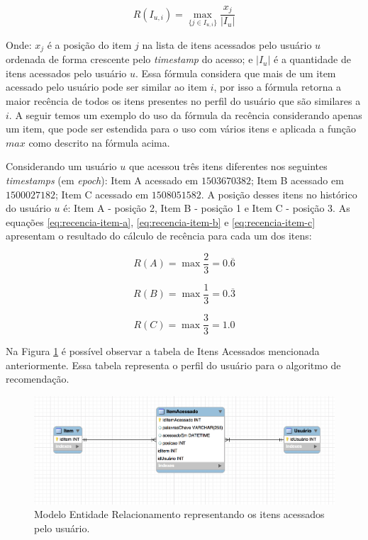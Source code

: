 \begin{equation}
  R(I_{u,i}) = \max_{\{j \in I_{u,i}\}}{\frac{x_j}{\left| I_u \right|}}
  \label{eq:recencia-proposta}
\end{equation}

Onde: $x_j$ é a posição do item $j$ na lista de itens acessados pelo usuário $u$ ordenada de forma crescente pelo
\textit{timestamp} do acesso; e $\left| I_u \right|$ é a quantidade de itens acessados pelo usuário $u$. Essa fórmula considera
que mais de um item acessado pelo usuário pode ser similar ao item $i$, por isso a fórmula retorna a maior recência de
todos os itens presentes no perfil do usuário que são similares a $i$. A seguir temos um exemplo do uso da fórmula da
recência considerando apenas um item, que pode ser estendida para o uso com vários itens e aplicada a função $max$ como descrito na
fórmula acima.

Considerando um usuário $u$ que acessou três itens diferentes nos seguintes \textit{timestamps} (em \textit{epoch}):
Item A acessado em $1503670382$; Item B acessado em $1500027182$; Item C acessado em $1508051582$. A posição desses itens
no histórico do usuário $u$ é: Item A - posição 2, Item B - posição 1 e Item C - posição 3. As equações \ref{eq:recencia-item-a},
\ref{eq:recencia-item-b} e \ref{eq:recencia-item-c} apresentam o resultado do cálculo de recência para cada um dos itens:

\begin{equation}
  R(A) = \max{\frac{2}{3}} = 0.\overline{6}
  \label{eq:recencia-item-a}
\end{equation}

\begin{equation}
  R(B) = \max{\frac{1}{3}} = 0.\overline{3}
  \label{eq:recencia-item-b}
\end{equation}

\begin{equation}
  R(C) = \max{\frac{3}{3}} = 1.0
  \label{eq:recencia-item-c}
\end{equation}

Na Figura \ref{fig:mer-item-acessado} é possível observar a tabela de Itens Acessados mencionada anteriormente. Essa tabela
representa o perfil do usuário para o algoritmo de recomendação.

\begin{figure}[htb]
  \caption{\label{fig:mer-item-acessado}Modelo Entidade Relacionamento representando os itens acessados pelo usuário.}
  \begin{center}
      \includegraphics[scale=0.5]{./Figuras/mer-item-acessado.png}
  \end{center}
\end{figure}

